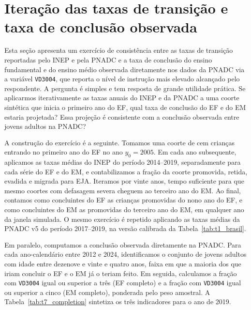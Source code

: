 
\section{Iteração das taxas de transição e taxa de conclusão observada}
\label{sec:iteracao}

Esta seção apresenta um exercício de consistência entre as taxas
de transição reportadas pelo INEP e pela PNADC e a taxa de
conclusão do ensino fundamental e do ensino médio observada
diretamente nos dados da PNADC via a variável \texttt{VD3004},
que reporta o nível de instrução mais elevado alcançado pelo
respondente. A pergunta é simples e tem resposta de grande
utilidade prática. Se aplicarmos iterativamente as taxas anuais
do INEP e da PNADC a uma coorte sintética que inicia o primeiro
ano do EF, qual taxa de conclusão do EF e do EM estaria
projetada? Essa projeção é consistente com a conclusão observada
entre jovens adultos na PNADC?

A construção do exercício é a seguinte. Tomamos uma coorte de
cem crianças entrando no primeiro ano do EF no ano $y_0 = 2005$.
Em cada ano subsequente, aplicamos as taxas médias do INEP do
período 2014--2019, separadamente para cada série do EF e do
EM, e contabilizamos a fração da coorte promovida, retida,
evadida e migrada para EJA. Iteramos por vinte anos, tempo
suficiente para que mesmo coortes com defasagem severa cheguem
ao terceiro ano do EM. Ao final, contamos como concluintes do
EF as crianças promovidas do nono ano do EF, e como concluintes
do EM as promovidas do terceiro ano do EM, em qualquer ano da
janela simulada. O mesmo exercício é repetido aplicando as
taxas médias da PNADC v5 do período 2017--2019, na versão
calibrada da Tabela~\ref{tab:t1_brasil}.

Em paralelo, computamos a conclusão observada diretamente na
PNADC. Para cada ano-calendário entre 2012 e 2024, identificamos
o conjunto de jovens adultos com idade entre dezenove e vinte e
quatro anos, faixa em que a maioria dos que iriam concluir o EF
e o EM já o teriam feito. Em seguida, calculamos a fração com
\texttt{VD3004} igual ou superior a três (EF completo) e a
fração com \texttt{VD3004} igual ou superior a cinco (EM
completo), ponderada pelo peso amostral. A
Tabela~\ref{tab:t7_completion} sintetiza os três indicadores
para o ano de 2019.

